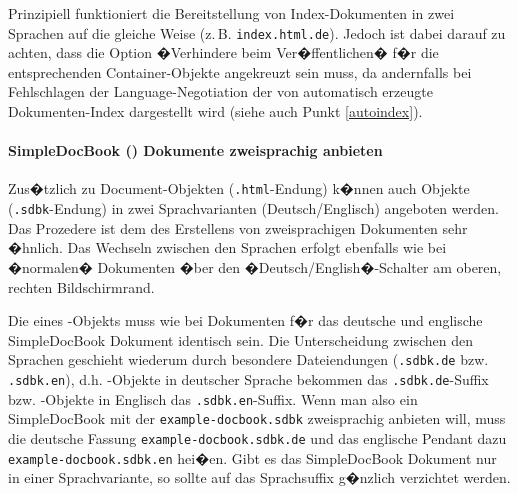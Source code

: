 \begin{Hinweis}
  Prinzipiell funktioniert die Bereitstellung von Index-Dokumenten in
  zwei Sprachen auf die gleiche Weise (z.\,B.
  \nolinkurl{index.html.de}). Jedoch ist dabei darauf zu achten, dass
  die Option �Verhindere  beim Ver�ffentlichen�
  f�r die entsprechenden Container-Objekte angekreuzt sein muss, da
  andernfalls bei Fehlschlagen der Language-Negotiation der von
   automatisch erzeugte Dokumenten-Index dargestellt
  wird (siehe auch Punkt \ref{autoindex}).
\end{Hinweis}

\paragraph{SimpleDocBook () Dokumente zweisprachig anbieten}

Zus�tzlich zu Document-Objekten (\nolinkurl{.html}-Endung) k�nnen auch Objekte
(\nolinkurl{.sdbk}-Endung) in zwei Sprachvarianten (Deutsch/Englisch) angeboten
werden. Das Prozedere ist dem des Erstellens von zweisprachigen Dokumenten sehr �hnlich. Das Wechseln zwischen den Sprachen erfolgt
ebenfalls wie bei �normalen� Dokumenten �ber den �Deutsch/English�-Schalter am oberen, rechten Bildschirmrand.

Die  eines -Objekts muss wie bei Dokumenten f�r
das deutsche und englische SimpleDocBook Dokument identisch sein. Die
Unterscheidung zwischen den Sprachen geschieht wiederum durch besondere
Dateiendungen (\nolinkurl{.sdbk.de} bzw. \nolinkurl{.sdbk.en}), d.h. -Objekte in
deutscher Sprache bekommen das \nolinkurl{.sdbk.de}-Suffix bzw. -Objekte in
Englisch das \nolinkurl{.sdbk.en}-Suffix. Wenn man also ein SimpleDocBook mit der
 \nolinkurl{example-docbook.sdbk} zweisprachig anbieten will, muss die deutsche
Fassung \nolinkurl{example-docbook.sdbk.de} und das englische Pendant dazu
\nolinkurl{example-docbook.sdbk.en} hei�en. Gibt es das SimpleDocBook Dokument nur in
einer Sprachvariante, so sollte auf das Sprachsuffix g�nzlich verzichtet werden.

